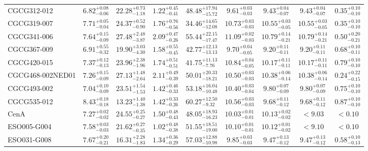 \documentclass[onecolumn]{mn2e}
\begin{document}
{\begin{center}
\begin{longtable}{lcccccccc}
CGCG312-012 & $6.82_{-0.06}^{+0.08}$ & $22.28_{-1.18}^{+0.73}$ & $1.22_{-0.41}^{+0.45}$ &$48.48_{-15.72}^{+17.94}$ & $9.61_{-0.03}^{+0.03}$ & $9.43_{-0.07}^{+0.04}$ & $9.43_{-0.07}^{+0.04}$ & $0.35_{-0.10}^{+0.10}$ \\
CGCG319-007 & $7.71_{-0.04}^{+0.05}$ & $24.37_{-0.90}^{+0.52}$ & $1.76_{-0.56}^{+0.76}$ &$34.46_{-12.08}^{+14.65}$ & $10.73_{-0.03}^{+0.03}$ & $10.55_{-0.05}^{+0.03}$ & $10.55_{-0.05}^{+0.03}$ & $0.35_{-0.10}^{+0.10}$ \\
CGCG341-006 & $7.64_{-0.09}^{+0.15}$ & $27.48_{-3.87}^{+2.48}$ & $2.09_{-0.26}^{+0.47}$ &$55.44_{-17.47}^{+22.15}$ & $11.09_{-0.03}^{+0.02}$ & $10.79_{-0.21}^{+0.14}$ & $10.79_{-0.21}^{+0.14}$ & $0.50_{-0.21}^{+0.20}$ \\
CGCG367-009 & $6.91_{-0.32}^{+0.55}$ & $19.90_{-4.30}^{+3.03}$ & $1.58_{-0.45}^{+0.55}$ &$42.77_{-13.13}^{+12.13}$ & $9.70_{-0.05}^{+0.04}$ & $9.20_{-0.11}^{+0.11}$ & $9.20_{-0.11}^{+0.11}$ & $0.68_{-0.11}^{+0.10}$ \\
CGCG420-015 & $7.37_{-0.13}^{+0.12}$ & $23.96_{-1.96}^{+2.38}$ & $1.74_{-0.51}^{+0.51}$ &$41.75_{-7.76}^{+11.13}$ & $10.84_{-0.05}^{+0.04}$ & $10.17_{-0.11}^{+0.11}$ & $10.17_{-0.11}^{+0.11}$ & $0.79_{-0.10}^{+0.10}$ \\
CGCG468-002NED01 & $7.26_{-0.09}^{+0.15}$ & $27.13_{-2.64}^{+1.48}$ & $2.11_{-0.39}^{+0.49}$ &$50.01_{-18.21}^{+20.33}$ & $10.50_{-0.03}^{+0.03}$ & $10.38_{-0.14}^{+0.06}$ & $10.38_{-0.14}^{+0.06}$ & $0.24_{-0.15}^{+0.22}$ \\
CGCG493-002 & $7.04_{-0.09}^{+0.10}$ & $23.51_{-1.53}^{+1.54}$ & $1.42_{-0.33}^{+0.46}$ &$53.18_{-10.48}^{+16.04}$ & $10.40_{-0.04}^{+0.03}$ & $9.80_{-0.09}^{+0.07}$ & $9.80_{-0.09}^{+0.07}$ & $0.75_{-0.10}^{+0.10}$ \\
CGCG535-012 & $8.43_{-0.18}^{+0.18}$ & $13.23_{-1.38}^{+1.40}$ & $1.42_{-0.26}^{+0.33}$ &$60.27_{-9.32}^{+12.50}$ & $10.56_{-0.03}^{+0.03}$ & $9.68_{-0.12}^{+0.11}$ & $9.68_{-0.12}^{+0.11}$ & $0.87_{-0.10}^{+0.10}$ \\
CenA & $7.27_{-0.02}^{+0.02}$ & $24.55_{-0.27}^{+0.25}$ & $1.50_{-0.43}^{+0.48}$ &$48.05_{-16.23}^{+18.93}$ & $10.03_{-0.01}^{+0.01}$ & $10.13_{-0.02}^{+0.02}$ & $<9.03$ & $<0.10$ \\
ESO005-G004 & $7.58_{-0.03}^{+0.03}$ & $21.62_{-0.35}^{+0.27}$ & $1.02_{-0.38}^{+0.48}$ &$51.55_{-19.00}^{+18.51}$ & $10.10_{-0.01}^{+0.01}$ & $10.12_{-0.02}^{+0.01}$ & $<9.10$ & $<0.10$ \\
ESO031-G008 & $7.67_{-0.21}^{+0.20}$ & $16.31_{-1.83}^{+2.28}$ & $1.34_{-0.29}^{+0.36}$ &$57.03_{-10.98}^{+12.88}$ & $9.85_{-0.03}^{+0.03}$ & $9.47_{-0.12}^{+0.13}$ & $9.47_{-0.12}^{+0.13}$ & $0.58_{-0.13}^{+0.10}$ \\

\end{longtable}
\end{center}}
\end{document}
